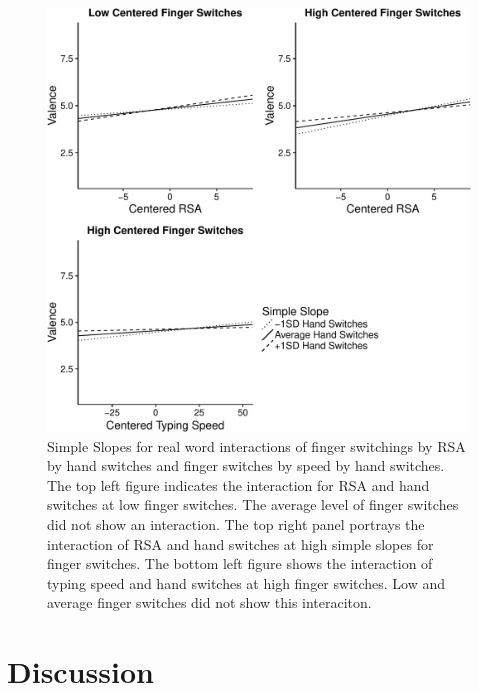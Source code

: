 \documentclass[english,man,man,mask]{apa6}
\theoremstyle{definition}
\theoremstyle{definition}
\theoremstyle{definition}
\theoremstyle{remark}
\begin{document}
\begin{figure}
\centering
\includegraphics{QWERTY_bibtest_files/figure-latex/graphs2-1.pdf}
\caption{\label{fig:graphs2}Simple Slopes for real word interactions of
finger switchings by RSA by hand switches and finger switches by speed
by hand switches. The top left figure indicates the interaction for RSA
and hand switches at low finger switches. The average level of finger
switches did not show an interaction. The top right panel portrays the
interaction of RSA and hand switches at high simple slopes for finger
switches. The bottom left figure shows the interaction of typing speed
and hand switches at high finger switches. Low and average finger
switches did not show this interaciton.}
\end{figure}

\section{Discussion}\label{discussion}
\end{document}
